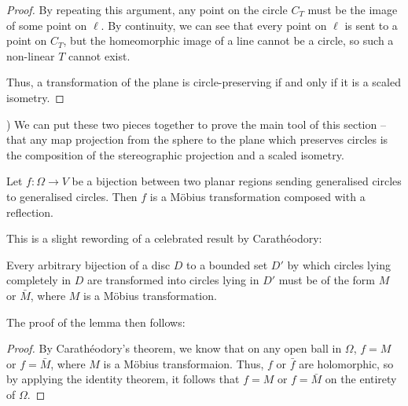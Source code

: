 {\begin{proof}
  By repeating this argument, any point on the circle $C_T$ must be
  the image of some point on $\ell$.  By continuity, we can see that
  every point on $\ell$ is sent to a point on $C_T$, but the
  homeomorphic image of a line cannot be a circle, so such
  a non-linear $T$ cannot exist.

  Thus, a transformation of the plane is circle-preserving if and only
  if it is a scaled isometry.
\end{proof}
)
We can put these two pieces together to prove the main tool of this
section -- that any map projection from the sphere to the plane which
preserves circles is the composition of the stereographic projection
and a scaled isometry.
}
\begin{lemma}
  Let $f:\Omega\to V$ be a bijection between two planar regions 
  sending generalised circles to generalised circles. 
  Then $f$ is a M\"{o}bius transformation composed with a 
  reflection.
\end{lemma}
This is a slight rewording of a celebrated result by 
Carath\'{e}odory\cite{caratheodory}:
\begin{theorem}
  Every arbitrary bijection of a disc $D$ to a bounded set $D'$ by which
  circles lying completely in $D$ are transformed into circles 
  lying in $D'$ must be of the form $M$ or $\bar M$, where $M$ is a 
  M\"{o}bius transformation.
\end{theorem}
The proof of the lemma then follows:
\begin{proof}
  By Carath\'{e}odory's theorem, we know that on any open 
  ball in $\Omega$, $f=M$ or $f=\bar M$, where 
  $M$ is a M\"{o}bius transformaion. Thus, $f$ or $\bar f$ 
  are holomorphic, so by applying the identity theorem, 
  it follows that $f = M$ or $f = \bar M$ on the entirety of 
  $\Omega$.
\end{proof}

